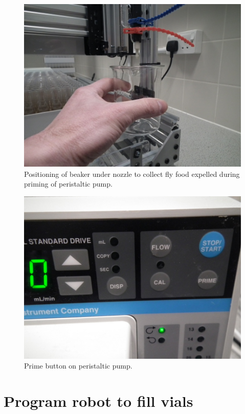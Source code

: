 \documentclass[
]{book}
\begin{document}
\begin{figure}

{\centering \includegraphics[width=0.75\linewidth]{images/prime_beaker} 

}

\caption{Positioning of beaker under nozzle to collect fly food expelled during priming of peristaltic pump.}\label{fig:primeBeaker}
\end{figure}

\begin{figure}

{\centering \includegraphics[width=0.75\linewidth]{images/prime_button} 

}

\caption{Prime button on peristaltic pump.}\label{fig:primeButton}
\end{figure}

\hypertarget{gcode}{%
\chapter{Program robot to fill vials}\label{gcode}}
\end{document}
